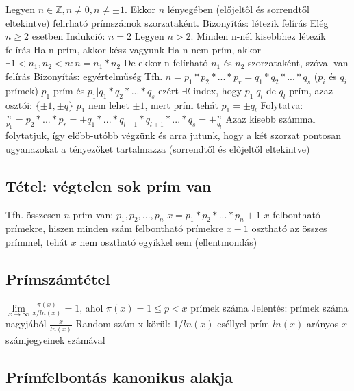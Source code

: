 \documentclass[12pt,a4paper]{article}
\begin{document}
\begin{outline}
	\1 Legyen $n \in \mathbb{Z}, n \ne 0, n \ne \pm 1$. Ekkor $n$ lényegében
	(előjeltől és sorrendtől eltekintve) felirható prímszámok szorzataként.
	\1 Bizonyítás: létezik felírás
		\2 Elég $n \ge 2$ esetben
		\2 Indukció: $n=2$
		\2 Legyen $n>2$. Minden n-nél kisebbhez létezik felírás
		\2 Ha n prím, akkor kész vagyunk
		\2 Ha n nem prím, akkor $\exists 1<n_1,n_2<n: n=n_1*n_2$
			\3 De ekkor n felírható $n_1$ és $n_2$ szorzataként, szóval van felírás
	\1 Bizonyítás: egyértelműség
		\2 Tfh. $n=p_1*p_2*...*p_r=q_1*q_2*...*q_s$ ($p_i$ és $q_i$ prímek)
		\2 $p_1$ prím és $p_1 | q_1*q_2*...*q_s$ ezért $\exists l$ index, hogy $p_1|q_l$
			\3 de $q_l$ prím, azaz osztói: $\{\pm 1, \pm q\}$
			\3 $p_1$ nem lehet $\pm 1$, mert prím
			\3 tehát $p_1 = \pm q_l$
		\2 Folytatva: $\frac{n}{p_1}=p_2*...*p_r=\pm q_1*...*q_{l-1}*q_{l+1}*...*q_s=\pm\frac{n}{q_l}$
		\2 Azaz kisebb számmal folytatjuk, így előbb-utóbb végzünk és arra jutunk,
		hogy a két szorzat pontosan ugyanazokat a tényezőket tartalmazza
		(sorrendtől és előjeltől eltekintve)
\end{outline}

\subsection{Tétel: végtelen sok prím van}

\begin{outline}
	\1 Tfh. összesen $n$ prím van: $p_1,p_2,...,p_n$
	\1 $x=p_1*p_2*...*p_n+1$
	\1 $x$ felbontható prímekre, hiszen minden szám felbontható prímekre
	\1 $x-1$ osztható az összes prímmel, tehát $x$ nem osztható egyikkel sem (ellentmondás)
\end{outline}

\pagebreak

\subsection{Prímszámtétel}

\begin{outline}
	\1 $\lim\limits_{x\to\infty} \frac{\pi(x)}{x/ln(x)}=1$, ahol $\pi(x)=1\le p < x$ prímek száma
	\1 Jelentés: prímek száma nagyjából $\frac{x}{ln(x)}$
	\1 Random szám x körül: $1/ln(x)$ eséllyel prím
		\2 $ln(x)$ arányos $x$ számjegyeinek számával
\end{outline}

\subsection{Prímfelbontás kanonikus alakja}
\end{document}
